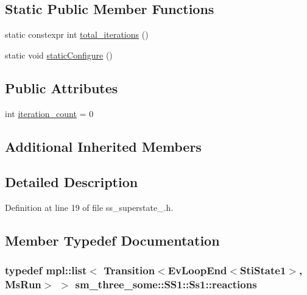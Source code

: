 \subsection*{Static Public Member Functions}
\begin{DoxyCompactItemize}
\item 
static constexpr int \hyperlink{structsm__three__some_1_1SS1_1_1Ss1_a02f44c29d4ebf2615b66a0783ee668e4}{total\+\_\+iterations} ()
\item 
static void \hyperlink{structsm__three__some_1_1SS1_1_1Ss1_a2697925f1d03b131fb253bf12d7bca08}{static\+Configure} ()
\end{DoxyCompactItemize}
\subsection*{Public Attributes}
\begin{DoxyCompactItemize}
\item 
int \hyperlink{structsm__three__some_1_1SS1_1_1Ss1_a775d2050e53513d711b041238b5c11ff}{iteration\+\_\+count} = 0
\end{DoxyCompactItemize}
\subsection*{Additional Inherited Members}


\subsection{Detailed Description}


Definition at line 19 of file ss\+\_\+superstate\+\_.\+h.



\subsection{Member Typedef Documentation}
\subsubsection[{\texorpdfstring{reactions}{reactions}}]{\setlength{\rightskip}{0pt plus 5cm}typedef mpl\+::list$<$ Transition$<$Ev\+Loop\+End$<${\bf Sti\+State1}$>$, {\bf Ms\+Run}$>$ $>$ {\bf sm\+\_\+three\+\_\+some\+::\+S\+S1\+::\+Ss1\+::reactions}}\hypertarget{structsm__three__some_1_1SS1_1_1Ss1_a5b379427d1cef174b121d44dddab7b85}{}\label{structsm__three__some_1_1SS1_1_1Ss1_a5b379427d1cef174b121d44dddab7b85}



